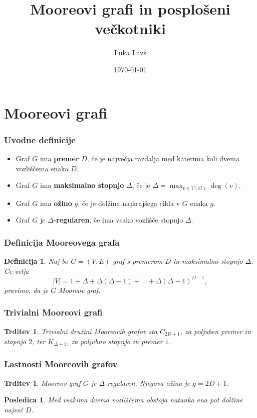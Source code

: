\documentclass{beamer}
\title{Mooreovi grafi in posplošeni večkotniki}
\author{Luka Lavš}
\date{\today}
\newtheorem{trditev}[izrek]{Trditev}
\newtheorem{posledica}[izrek]{Posledica}
\newtheorem{definicija}[izrek]{Definicija}
\begin{document}
\begin{frame}
    \titlepage
\end{frame}

\section{Mooreovi grafi}

\begin{frame}
    \frametitle{Uvodne definicije}
    \begin{itemize}
        \item[\textbullet] Graf $G$ ima \textbf{premer} $D$, če je največja razdalja med  
        katerima koli dvema vozliščema enaka $D$.
        \item[\textbullet] Graf $G$ ima \textbf{maksimalno stopnjo} $\Delta$, če je
        $\Delta = \max_{v \in V(G)} \deg(v)$.
        \item[\textbullet] Graf $G$ ima \textbf{ožino} $g$, če je dolžina 
        najkrajšega cikla v $G$ enaka $g$.
        \item[\textbullet] Graf $G$ je \textbf{$\Delta$-regularen}, če ima vsako 
        vozlišče stopnjo $\Delta$.
    \end{itemize}
\end{frame}

\begin{frame}
\frametitle{Definicija Mooreovega grafa}
\begin{definicija}
Naj bo $G=(V,E)$ graf s premerom $D$ in maksimalno stopnjo $\Delta$.  
Če velja
\[
|V| = 1 + \Delta + \Delta(\Delta-1) + \dots + \Delta(\Delta-1)^{D-1},
\]
pravimo, da je $G$ \emph{Mooreov graf}.
\end{definicija}
\end{frame}

\begin{frame}
\frametitle{Trivialni Mooreovi grafi}
\begin{trditev}
    Trivialni družini Mooreovih grafov sta $C_{2D+1}$, za poljuben premer 
    in stopnjo $2$, ter $K_{\Delta+1}$, za poljubno stopnjo in premer $1$.
\end{trditev}
\end{frame}

\begin{frame}
\frametitle{Lastnosti Mooreovih grafov}
\begin{trditev}
Mooreov graf $G$ je $\Delta$-regularen. 
Njegova ožina je $g = 2D + 1$.
\end{trditev}

\begin{posledica}
Med vsakima dvema vozliščema obstaja natanko ena pot dolžine največ $D$.
\end{posledica}
\end{frame}
\end{document}

